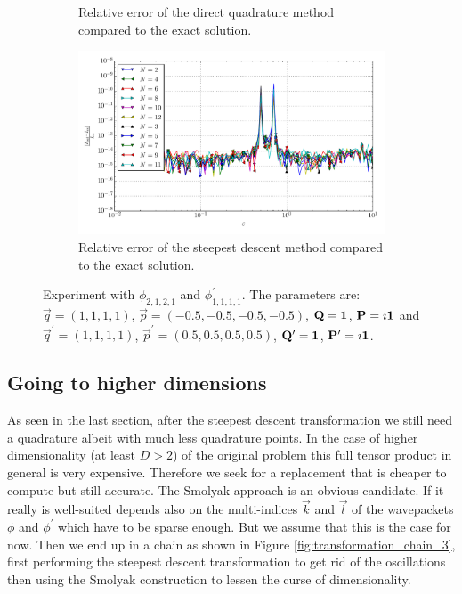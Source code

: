 \documentclass[a4paper,10pt]{article}
\begin{document}
\begin{figure}[ht!]
\begin{subfigure}[t]{0.5\linewidth}
    \caption{Relative error of the direct quadrature method compared to the exact solution.}
    \label{fig:tp_4d_conv_eps_2121_1111_err_qr}
  \end{subfigure}
  \begin{subfigure}[t]{0.5\linewidth}
    \includegraphics[width=\linewidth]{./plots/tp_4d_conv_eps_(2,1,2,1)_(1,1,1,1)_err_rel_nsd.pdf}
    \caption{Relative error of the steepest descent method compared to the exact solution.}
    \label{fig:tp_4d_conv_eps_2121_1111_err_nsd}
  \end{subfigure}
  \label{fig:tp_4d_conv_eps_2121_1111}
  \caption{Experiment with $\phi_{2,1,2,1}$ and $\phi_{1,1,1,1}^{\prime}$.
  The parameters are:
  $\vec{q} = (1, 1, 1, 1)$,
  $\vec{p} = (-0.5, -0.5, -0.5, -0.5)$,
  $\mathbf{Q} = \mathbf{1}$,
  $\mathbf{P} = \imath \mathbf{1}$
  and
  $\vec{q}^\prime = (1, 1, 1, 1)$,
  $\vec{p}^\prime = (0.5, 0.5, 0.5, 0.5)$,
  $\mathbf{Q}^\prime = \mathbf{1}$,
  $\mathbf{P}^\prime = \imath \mathbf{1}$.}
\end{figure}


\FloatBarrier
\subsection{Going to higher dimensions}


As seen in the last section, after the steepest descent transformation we still
need a quadrature albeit with much less quadrature points. In the case of higher
dimensionality (at least $D > 2$) of the original problem this full tensor product
in general is very expensive. Therefore we seek for a replacement that is cheaper
to compute but still accurate. The Smolyak approach is an obvious candidate.
If it really is well-suited depends also on the multi-indices $\vec{k}$ and
$\vec{l}$ of the wavepackets $\phi$ and $\phi^\prime$ which have to be sparse
enough. But we assume that this is the case for now. Then we end up in a chain
as shown in Figure \ref{fig:transformation_chain_3}, first performing the steepest
descent transformation to get rid of the oscillations then using the Smolyak
construction to lessen the curse of dimensionality.
\end{document}
